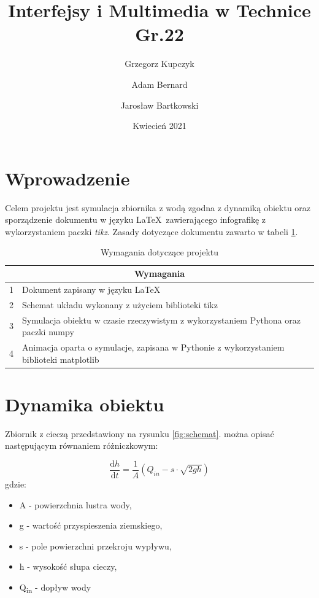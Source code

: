 \documentclass{article}
\title{Interfejsy i Multimedia w Technice Gr.22}
\author{
    Grzegorz Kupczyk
    \and
    Adam Bernard
    \and
    Jarosław Bartkowski
}
\date{Kwiecień 2021}
\begin{document}
\maketitle

\section{Wprowadzenie}
Celem projektu jest symulacja zbiornika z wodą zgodna z dynamiką obiektu oraz sporządzenie dokumentu w języku \LaTeX\ zawierającego infografikę z wykorzystaniem paczki \textit{tikz}. Zasady dotyczące dokumentu zawarto w tabeli \ref{wymagania}.

\begin{table}[]
    \begin{tabular}{|l|l|}
        \hline
        \multicolumn{2}{|c|}{\textbf{Wymagania}}                                                    \\ \hline
        1 & Dokument zapisany w języku LaTeX                                                        \\ \hline
        2 & Schemat układu wykonany z użyciem biblioteki tikz                                       \\ \hline
        3 & Symulacja obiektu w czasie rzeczywistym z wykorzystaniem Pythona oraz paczki numpy      \\ \hline
        4 & Animacja oparta o symulacje, zapisana w Pythonie z wykorzystaniem biblioteki matplotlib \\ \hline
    \end{tabular}
    \caption[Wymagania]{Wymagania dotyczące projektu}\label{wymagania}
\end{table}

\section{Dynamika obiektu}
Zbiornik z cieczą przedstawiony na rysunku \ref{fig:schemat}. można opisać następującym równaniem różniczkowym:

\begin{equation}
\label{rozniczka}
    \frac{\text{d}h}{\text{d}t} = \frac{1}{A}( Q_{in} - s\cdot \sqrt{2gh}) 
\end{equation} 
gdzie:
\begin{itemize}
  \item A - powierzchnia lustra wody,
  \item g - wartość przyspieszenia ziemskiego,
  \item s - pole powierzchni przekroju wypływu,
  \item h - wysokość słupa cieczy,
  \item Q\textsubscript{in} - dopływ wody
  
\end{itemize}
\end{document}
